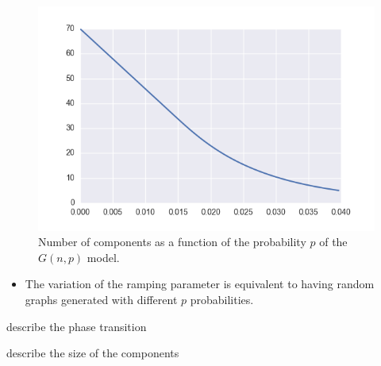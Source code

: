 \begin{figure}[tb]
	\centering
	\includegraphics[]{figures/gnp_number_components.png}
	\caption{Number of components as a function of the probability $p$ of the $G(n,p)$ model.}
	\label{fig:figure1}
\end{figure}


\begin{itemize}
	\item The variation of the ramping parameter is equivalent to having random graphs generated with different $p$ probabilities.
\end{itemize}


describe the phase transition


describe the size of the components


